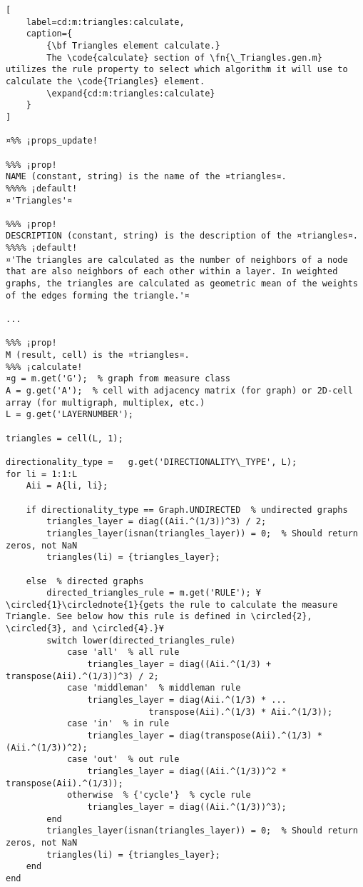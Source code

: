 \documentclass{tufte-handout}
\begin{document}
\begin{lstlisting}[
	label=cd:m:triangles:calculate,
	caption={
		{\bf Triangles element calculate.}
		The \code{calculate} section of \fn{\_Triangles.gen.m} utilizes the rule property to select which algorithm it will use to calculate the \code{Triangles} element.
		\expand{cd:m:triangles:calculate}
	}
]

¤%% ¡props_update!

%%% ¡prop!
NAME (constant, string) is the name of the ¤triangles¤.
%%%% ¡default!
¤'Triangles'¤

%%% ¡prop!
DESCRIPTION (constant, string) is the description of the ¤triangles¤.
%%%% ¡default!
¤'The triangles are calculated as the number of neighbors of a node that are also neighbors of each other within a layer. In weighted graphs, the triangles are calculated as geometric mean of the weights of the edges forming the triangle.'¤

...

%%% ¡prop!
M (result, cell) is the ¤triangles¤.
%%% ¡calculate!
¤g = m.get('G');  % graph from measure class
A = g.get('A');  % cell with adjacency matrix (for graph) or 2D-cell array (for multigraph, multiplex, etc.) 
L = g.get('LAYERNUMBER');

triangles = cell(L, 1);

directionality_type =   g.get('DIRECTIONALITY\_TYPE', L);
for li = 1:1:L        
	Aii = A{li, li};    
	
	if directionality_type == Graph.UNDIRECTED  % undirected graphs
		triangles_layer = diag((Aii.^(1/3))^3) / 2;
		triangles_layer(isnan(triangles_layer)) = 0;  % Should return zeros, not NaN
		triangles(li) = {triangles_layer};
	
	else  % directed graphs
		directed_triangles_rule = m.get('RULE'); ¥\circled{1}\circlednote{1}{gets the rule to calculate the measure Triangle. See below how this rule is defined in \circled{2}, \circled{3}, and \circled{4}.}¥
		switch lower(directed_triangles_rule)
			case 'all'  % all rule
				triangles_layer = diag((Aii.^(1/3) + transpose(Aii).^(1/3))^3) / 2;
			case 'middleman'  % middleman rule
				triangles_layer = diag(Aii.^(1/3) * ...
							transpose(Aii).^(1/3) * Aii.^(1/3));
			case 'in'  % in rule
				triangles_layer = diag(transpose(Aii).^(1/3) * (Aii.^(1/3))^2);
			case 'out'  % out rule
				triangles_layer = diag((Aii.^(1/3))^2 * transpose(Aii).^(1/3));
			otherwise  % {'cycle'}  % cycle rule
				triangles_layer = diag((Aii.^(1/3))^3);
		end
		triangles_layer(isnan(triangles_layer)) = 0;  % Should return zeros, not NaN
		triangles(li) = {triangles_layer};
	end
end


\end{lstlisting}
\end{document}

